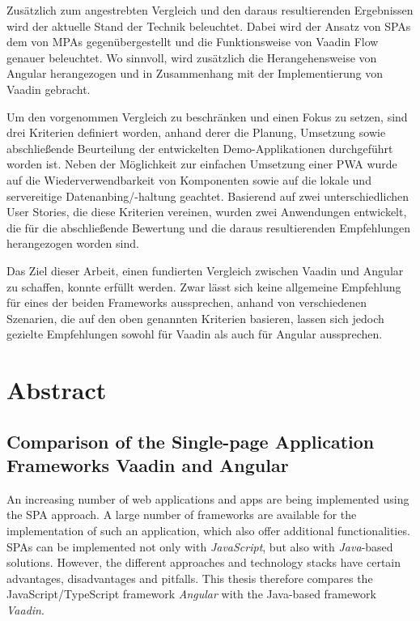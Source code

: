 \documentclass[a4paper,12pt,twoside]{scrreprt}
\begin{document}
\smallskip

Zusätzlich zum angestrebten Vergleich und den daraus resultierenden Ergebnissen wird der aktuelle Stand der Technik beleuchtet. Dabei wird der Ansatz von \acsp{SPA} dem von \acsp{MPA} gegenübergestellt und die Funktionsweise von Vaadin Flow genauer beleuchtet. Wo sinnvoll, wird zusätzlich die Herangehensweise von Angular herangezogen und in Zusammenhang mit der Implementierung von Vaadin gebracht.

\smallskip

Um den vorgenommen Vergleich zu beschränken und einen Fokus zu setzen, sind drei Kriterien definiert worden, anhand derer die Planung, Umsetzung sowie abschließende Beurteilung der entwickelten Demo-Applikationen durchgeführt worden ist. Neben der Möglichkeit zur einfachen Umsetzung einer \acs{PWA} wurde auf die Wiederverwendbarkeit von Komponenten sowie auf die lokale und servereitige Datenanbing/-haltung geachtet. Basierend auf zwei unterschiedlichen User Stories, die diese Kriterien vereinen, wurden zwei Anwendungen entwickelt, die für die abschließende Bewertung und die daraus resultierenden Empfehlungen herangezogen worden sind.

\smallskip

Das Ziel dieser Arbeit, einen fundierten Vergleich zwischen Vaadin und Angular zu schaffen, konnte erfüllt werden. Zwar lässt sich keine allgemeine Empfehlung für eines der beiden Frameworks aussprechen, anhand von verschiedenen Szenarien, die auf den oben genannten Kriterien basieren, lassen sich jedoch gezielte Empfehlungen sowohl für Vaadin als auch für Angular aussprechen.

\newpage
\section*{Abstract}
\label{sec:abstract}

\subsection*{Comparison of the Single-page Application Frameworks Vaadin and Angular}

An increasing number of web applications and apps are being implemented using the \acs{SPA} approach. A large number of frameworks are available for the implementation of such an application, which also offer additional functionalities. \acsp{SPA} can be implemented not only with \textit{JavaScript}, but also with \textit{Java}-based solutions. However, the different approaches and technology stacks have certain advantages, disadvantages and pitfalls. This thesis therefore compares the JavaScript/TypeScript framework \textit{Angular} with the Java-based framework \textit{Vaadin}.
\end{document}
